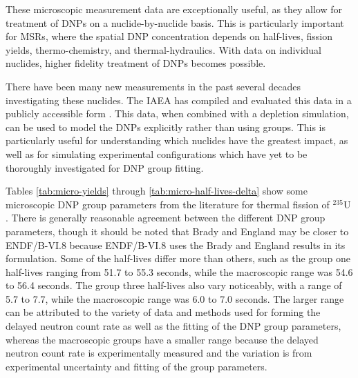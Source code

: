 These microscopic measurement data are exceptionally useful, as they allow for treatment of \glspl{DNP} on a nuclide-by-nuclide basis.
This is particularly important for \glspl{MSR}, where the spatial \gls{DNP} concentration depends on half-lives, fission yields, thermo-chemistry, and thermal-hydraulics.
With data on individual nuclides, higher fidelity treatment of \glspl{DNP} becomes possible.

There have been many new measurements in the past several decades investigating these nuclides.
The \gls{IAEA} has compiled and evaluated this data in a publicly accessible form \cite{DIMITRIOU2021144, dillmann2015summary}.
This data, when combined with a depletion simulation, can be used to model the \glspl{DNP} explicitly rather than using groups.
This is particularly useful for understanding which nuclides have the greatest impact, as well as for simulating experimental configurations which have yet to be thoroughly investigated for \gls{DNP} group fitting.


Tables \ref{tab:micro-yields} through \ref{tab:micro-half-lives-delta} show some microscopic \gls{DNP} group parameters from the literature for thermal fission of $^{235}$U \cite{parish1999status}.
There is generally reasonable agreement between the different \gls{DNP} group parameters, though it should be noted that Brady and England may be closer to ENDF/B-VI.8 because ENDF/B-VI.8 uses the Brady and England results in its formulation.
Some of the half-lives differ more than others, such as the group one half-lives ranging from 51.7 to 55.3 seconds, while the macroscopic range was 54.6 to 56.4 seconds.
The group three half-lives also vary noticeably, with a range of 5.7 to 7.7, while the macroscopic range was 6.0 to 7.0 seconds.
The larger range can be attributed to the variety of data and methods used for forming the delayed neutron count rate as well as the fitting of the \gls{DNP} group parameters, whereas the macroscopic groups have a smaller range because the delayed neutron count rate is experimentally measured and the variation is from experimental uncertainty and fitting of the group parameters.



